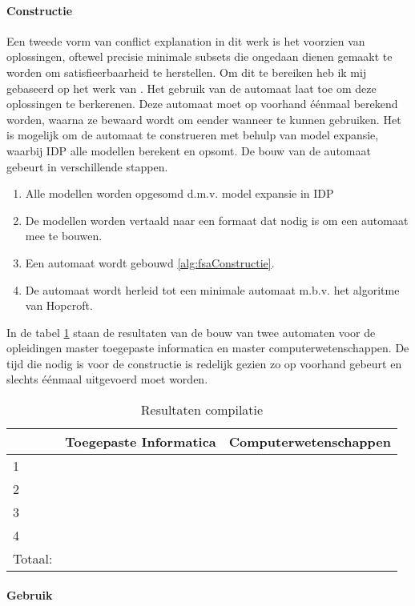 \paragraph{Constructie}
Een tweede vorm van conflict explanation in dit werk is het voorzien van oplossingen, oftewel precisie minimale subsets die ongedaan dienen gemaakt te worden om satisfieerbaarheid te herstellen. Om dit te bereiken heb ik mij gebaseerd op het werk van \citep{amilhastre2002consistency}. Het gebruik van de automaat laat toe om deze oplossingen te berkerenen. Deze automaat moet op voorhand \'{e}\'{e}nmaal berekend worden, waarna ze bewaard wordt om eender wanneer te kunnen gebruiken. Het is mogelijk om de automaat te construeren met behulp van model expansie, waarbij IDP alle modellen berekent en opsomt. De bouw van de automaat gebeurt in verschillende stappen. 
\begin{enumerate}
\item Alle modellen worden opgesomd d.m.v. model expansie in IDP
\item De modellen worden vertaald naar een formaat dat nodig is om een automaat mee te bouwen.
\item Een automaat wordt gebouwd \ref{alg:fsaConstructie}.
\item De automaat wordt herleid tot een minimale automaat m.b.v. het algoritme van Hopcroft.
\end{enumerate}
In de tabel \ref{tab:compilatie} staan de resultaten van de bouw van twee automaten voor de opleidingen master toegepaste informatica en master computerwetenschappen. De tijd die nodig is voor de constructie is redelijk gezien zo op voorhand gebeurt en slechts \'{e}\'{e}nmaal uitgevoerd moet worden.
\begin{table}[]
\centering
\caption{Resultaten compilatie}
\label{tab:compilatie}
\begin{tabular}{|l|l|l|}
\hline
 & Toegepaste Informatica & Computerwetenschappen \\ \hline
1 &  &  \\ \hline
2 &  &  \\ \hline
3 &  &  \\ \hline
4 &  &  \\ \hline
Totaal: &  &  \\ \hline
\end{tabular}
\end{table}

\paragraph{Gebruik}


